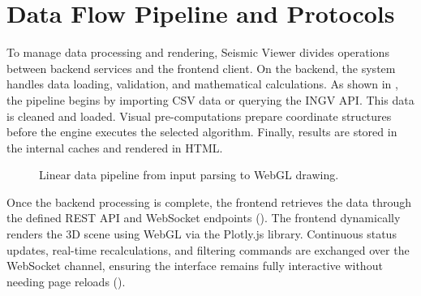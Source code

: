 \section{Data Flow Pipeline and Protocols}
\label{sec:dataflow}
\label{sec:protocols}

To manage data processing and rendering, Seismic Viewer divides operations between backend services and the frontend client. On the backend, the system handles data loading, validation, and mathematical calculations. As shown in , the pipeline begins by importing CSV data or querying the INGV API. This data is cleaned and loaded. Visual pre-computations prepare coordinate structures before the engine executes the selected algorithm. Finally, results are stored in the internal caches and rendered in HTML.

\begin{figure}[htbp]
\centering
{}
\caption{Linear data pipeline from input parsing to WebGL drawing.}
\label{fig:dataflow}
\end{figure}

Once the backend processing is complete, the frontend retrieves the data through the defined REST API and WebSocket endpoints (). The frontend dynamically renders the 3D scene using WebGL via the Plotly.js library. Continuous status updates, real-time recalculations, and filtering commands are exchanged over the WebSocket channel, ensuring the interface remains fully interactive without needing page reloads ().

